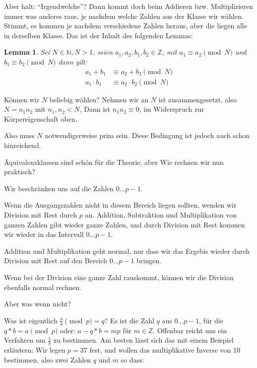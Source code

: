 \documentclass{article}
\newcommand{\N}{\mathbb{N}}
\newcommand{\Z}{\mathbb{Z}}
\newcounter{thm}
\newtheorem{lemma}[thm]{Lemma}
\begin{document}
Aber halt: ``Irgendwelche''? Dann kommt doch beim Addieren bzw. Multiplizieren
immer was anderes raus, je nachdem welche Zahlen aus der Klasse wir
wählen. Stimmt, es kommen je nachdem verschiedene Zahlen heraus, aber die
liegen alle in derselben Klasse. Das ist der Inhalt des folgenden Lemmas:

\begin{lemma}
    Sei $N \in \N, N > 1$, seien $a_1, a_2, b_1, b_2 \in \Z$,
    mit $a_1 \equiv a_2 \pmod N$ und $b_1 \equiv b_2 \pmod N$  dann gilt:
    \begin{equation}
      \begin{split}
        \label{op:mod}
        a_1 + b_1 & \equiv  a_2 + b_2 \pmod N \\
        a_1 \cdot b_1 & \equiv  a_2 \cdot b_2 \pmod N
      \end{split}
    \end{equation}
\end{lemma}

Können wir $N$ beliebig wählen? Nehmen wir an $N$ ist zusammengesetzt, also
$N = n_1 n_2$ mit $n_1, n_2 < N$, Dann ist $n_1 n_2 \equiv 0$, im Widerspruch zur
Körpereigenschaft oben.

Also muss $N$ notwendigerweise prim sein. Diese Bedingung ist jedoch auch
schon hinreichend.

Äquivalenzklassen sind schön für die Theorie, aber Wie rechnen wir nun
praktisch?

Wir beschränken uns auf die Zahlen $0 \ldots p-1$.

Wenn die Ausgangszahlen nicht in diesem Bereich liegen sollten, wenden wir
Division mit Rest durch $p$ an. Addition, Subtraktion und Multiplikation von
ganzen Zahlen gibt wieder ganze Zahlen, und durch Division mit Rest kommen wir
wieder in das Intervall $0 \ldots p-1$.

Addition und Multiplikation geht normal, nur dass wir das
Ergebis wieder durch Division mit Rest auf den Bereich $0 \ldots p-1$ bringen.

Wenn bei der Division eine ganze Zahl rauskommt, können wir die Division
ebenfalls normal rechnen.

Aber was wenn nicht?

Was ist eigentlich $\frac a b \pmod p = q$? Es ist die Zahl $q$ aus
$0 \ldots p-1$, für
die $q*b = a \pmod p$ oder:  $a - q*b = m p$ für $m \in \Z$. Offenbar reicht
uns ein Verfahren um $\frac 1 b$ zu bestimmen. Am besten lässt sich das mit
einem Beispiel erläutern: Wir legen $p=37$ fest, und wollen das multiplikative
Inverse von 10 bestimmen, also zwei Zahlen $q$ und $m$ so dass:
\end{document}
